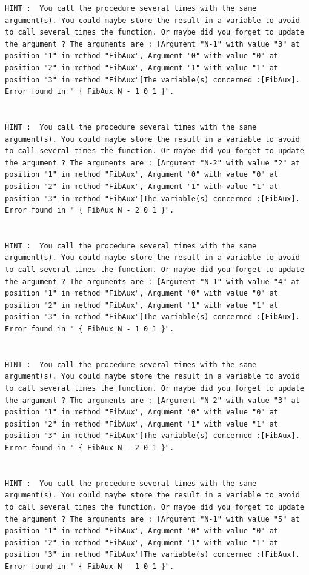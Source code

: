 \documentclass[11pt,a4paper,twoside,openright]{report}
\begin{document}
\begin{lstlisting}
HINT :  You call the procedure several times with the same argument(s). You could maybe store the result in a variable to avoid to call several times the function. Or maybe did you forget to update the argument ? The arguments are : [Argument "N-1" with value "3" at position "1" in method "FibAux", Argument "0" with value "0" at position "2" in method "FibAux", Argument "1" with value "1" at position "3" in method "FibAux"]The variable(s) concerned :[FibAux]. Error found in " { FibAux N - 1 0 1 }".


HINT :  You call the procedure several times with the same argument(s). You could maybe store the result in a variable to avoid to call several times the function. Or maybe did you forget to update the argument ? The arguments are : [Argument "N-2" with value "2" at position "1" in method "FibAux", Argument "0" with value "0" at position "2" in method "FibAux", Argument "1" with value "1" at position "3" in method "FibAux"]The variable(s) concerned :[FibAux]. Error found in " { FibAux N - 2 0 1 }".


HINT :  You call the procedure several times with the same argument(s). You could maybe store the result in a variable to avoid to call several times the function. Or maybe did you forget to update the argument ? The arguments are : [Argument "N-1" with value "4" at position "1" in method "FibAux", Argument "0" with value "0" at position "2" in method "FibAux", Argument "1" with value "1" at position "3" in method "FibAux"]The variable(s) concerned :[FibAux]. Error found in " { FibAux N - 1 0 1 }".


HINT :  You call the procedure several times with the same argument(s). You could maybe store the result in a variable to avoid to call several times the function. Or maybe did you forget to update the argument ? The arguments are : [Argument "N-2" with value "3" at position "1" in method "FibAux", Argument "0" with value "0" at position "2" in method "FibAux", Argument "1" with value "1" at position "3" in method "FibAux"]The variable(s) concerned :[FibAux]. Error found in " { FibAux N - 2 0 1 }".


HINT :  You call the procedure several times with the same argument(s). You could maybe store the result in a variable to avoid to call several times the function. Or maybe did you forget to update the argument ? The arguments are : [Argument "N-1" with value "5" at position "1" in method "FibAux", Argument "0" with value "0" at position "2" in method "FibAux", Argument "1" with value "1" at position "3" in method "FibAux"]The variable(s) concerned :[FibAux]. Error found in " { FibAux N - 1 0 1 }".



\end{lstlisting}
\end{document}
